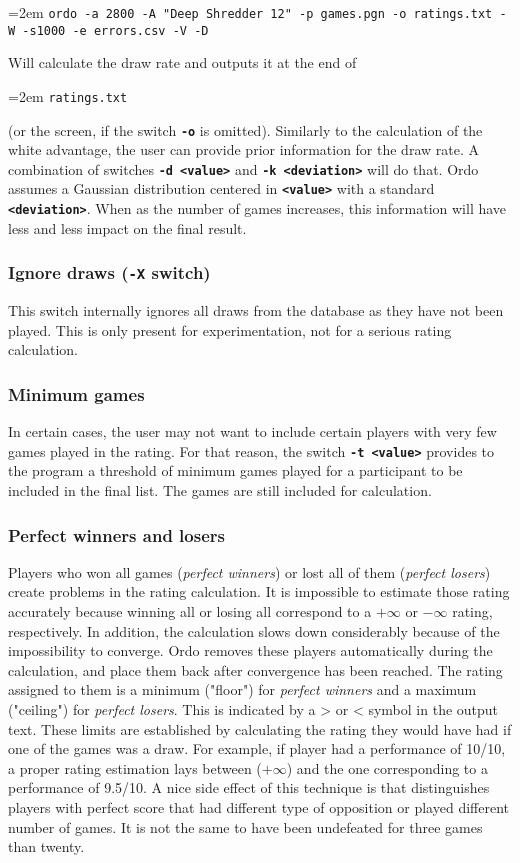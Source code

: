 \documentclass[12pt]{article}
\newcommand{\swtch} [1] {\texttt{\textbf{#1}}}
\newcommand{\cmdln}[1]{
	\par
	\begingroup
		\leftskip=2em
		\addtolength{\rightskip}{0em}
		\noindent \small{\texttt{#1}}
		\par
	\endgroup
}
\begin{document}
\cmdln{ordo -a 2800 -A "Deep Shredder 12" -p games.pgn -o ratings.txt -W -s1000 -e errors.csv -V -D}

Will calculate the draw rate and outputs it at the end of \cmdln{ratings.txt} (or the screen, if the switch \swtch{-o} is omitted). 
Similarly to the calculation of the white advantage, the user can provide prior information for the draw rate.
A combination of switches \swtch{-d <value>} and \swtch{-k <deviation>} will do that.
Ordo assumes a Gaussian distribution centered in \swtch{<value>} with a standard \swtch{<deviation>}.
When as the number of games increases, this information will have less and less impact on the final result.

\subsubsection*{Ignore draws (\swtch{-X} switch)}

This switch internally ignores all draws from the database as they have not been played.
This is only present for experimentation, not for a serious rating calculation.

\subsubsection*{Minimum games}

In certain cases, the user may not want to include certain players with very few games played in the rating. 
For that reason, the switch \swtch{-t <value>} provides to the program a threshold of minimum games played for a participant to be included in the final list.
The games are still included for calculation.

\subsubsection*{Perfect winners and losers}

Players who won all games (\textit{perfect winners}) or lost all of them (\textit{perfect losers}) create problems in the rating calculation.
It is impossible to estimate those rating accurately because winning all or losing all correspond to a $+\infty$ or $-\infty$ rating, respectively.
In addition, the calculation slows down considerably because of the impossibility to converge.
Ordo removes these players automatically during the calculation, and place them back after convergence has been reached.
The rating assigned to them is a minimum ("floor") for \textit{perfect winners} and a maximum ("ceiling") for \textit{perfect losers}.
This is indicated by a > or < symbol in the output text.
These limits are established by calculating the rating they would have had if one of the games was a draw.
For example, if player had a performance of 10/10, a proper rating estimation lays between ($+\infty$) and the one corresponding to a performance of 9.5/10.
A nice side effect of this technique is that distinguishes players with perfect score that had different type of opposition or played different number of games.
It is not the same to have been undefeated for three games than twenty.
\end{document}
